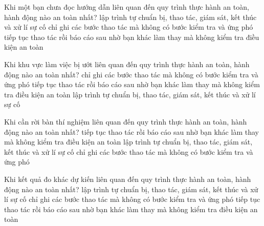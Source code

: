 \begin{ex}
Khi một bạn chưa đọc hướng dẫn liên quan đến quy trình thực hành an toàn, hành động nào an toàn nhất?
\choice
{\True lập trình tự chuẩn bị, thao tác, giám sát, kết thúc và xử lí sự cố}
{chỉ ghi các bước thao tác mà không có bước kiểm tra và ứng phó}
{tiếp tục thao tác rồi báo cáo sau}
{nhờ bạn khác làm thay mà không kiểm tra điều kiện an toàn}
\end{ex}

\begin{ex}
Khi khu vực làm việc bị ướt liên quan đến quy trình thực hành an toàn, hành động nào an toàn nhất?
\choice
{chỉ ghi các bước thao tác mà không có bước kiểm tra và ứng phó}
{tiếp tục thao tác rồi báo cáo sau}
{nhờ bạn khác làm thay mà không kiểm tra điều kiện an toàn}
{\True lập trình tự chuẩn bị, thao tác, giám sát, kết thúc và xử lí sự cố}
\end{ex}

\begin{ex}
Khi cần rời bàn thí nghiệm liên quan đến quy trình thực hành an toàn, hành động nào an toàn nhất?
\choice
{tiếp tục thao tác rồi báo cáo sau}
{nhờ bạn khác làm thay mà không kiểm tra điều kiện an toàn}
{\True lập trình tự chuẩn bị, thao tác, giám sát, kết thúc và xử lí sự cố}
{chỉ ghi các bước thao tác mà không có bước kiểm tra và ứng phó}
\end{ex}

\begin{ex}
Khi kết quả đo khác dự kiến liên quan đến quy trình thực hành an toàn, hành động nào an toàn nhất?
\choice
{\True lập trình tự chuẩn bị, thao tác, giám sát, kết thúc và xử lí sự cố}
{chỉ ghi các bước thao tác mà không có bước kiểm tra và ứng phó}
{tiếp tục thao tác rồi báo cáo sau}
{nhờ bạn khác làm thay mà không kiểm tra điều kiện an toàn}
\end{ex}

